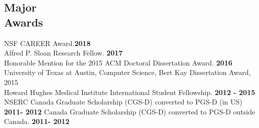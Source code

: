 \documentclass[margin,line,letterpaper]{resume}
\begin{document}
\begin{resume}
\begin{small}
      \vspace{-2mm}
    \section{\mysidestyle Major \\Awards}
    NSF CAREER Award.\hfill \textbf{2018}\\
    Alfred P. Sloan Research Fellow.\hfill \textbf{ 2017}\\
    Honorable Mention for the 2015 ACM Doctoral Dissertation Award.\hfill \textbf{ 2016}\\
     University of Texas at Austin, Computer Science, Bert Kay Dissertation Award, 2015\vspace{2mm}\\
     Howard Hughes Medical Institute International Student Fellowship. \hfill \textbf{2012 - 2015}
     \\ NSERC Canada Graduate Scholarship (CGS-D) converted to PGS-D (in US) \hfill \textbf{2011- 2012} 
     Canada Graduate Scholarship (CGS-D) converted to PGS-D outside Canada. \hfill \textbf{2011- 2012} 
     
%    
%    
    

\end{small}
\end{resume}
\end{document}
